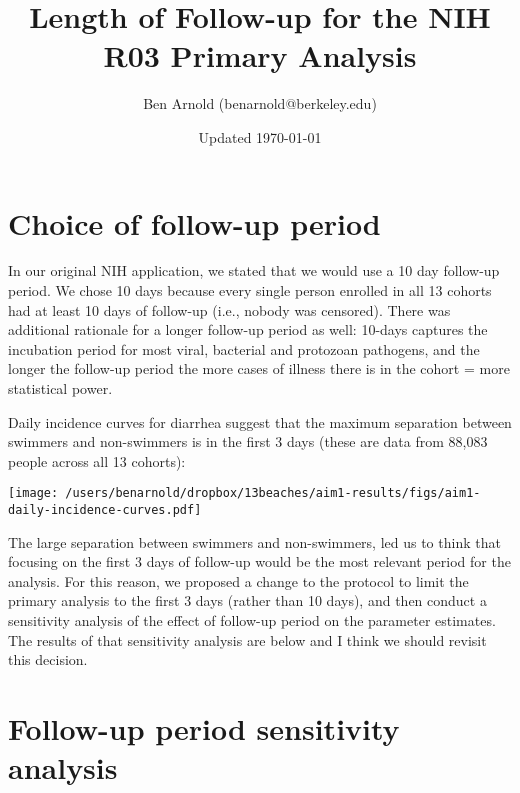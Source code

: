 \documentclass[11pt]{article}
\title{Length of Follow-up for the NIH R03 Primary Analysis}
\author{Ben Arnold (benarnold@berkeley.edu)}
\date{Updated \today}
\begin{document}
\maketitle


\section*{Choice of follow-up period}

In our original NIH application, we stated that we would use a 10 day follow-up period. We chose 10 days because every single person enrolled in all 13 cohorts had at least 10 days of follow-up (i.e., nobody was censored).  There was additional rationale for a longer follow-up period as well: 10-days captures the incubation period for most viral, bacterial and protozoan pathogens, and the longer the follow-up period the more cases of illness there is in the cohort = more statistical power.

Daily incidence curves for diarrhea suggest that the maximum separation between swimmers and non-swimmers is in the first 3 days (these are data from 88,083 people across all 13 cohorts):

\begin{center}
\texttt{[image: /users/benarnold/dropbox/13beaches/aim1-results/figs/aim1-daily-incidence-curves.pdf]}
\end{center}

The large separation between swimmers and non-swimmers, led us to think that focusing on the first 3 days of follow-up would be the most relevant period for the analysis.  For this reason, we proposed a change to the protocol to limit the primary analysis to the first 3 days (rather than 10 days), and then conduct a sensitivity analysis of the effect of follow-up period on the parameter estimates.  The results of that sensitivity analysis are below and I think we should revisit this decision.

\section*{Follow-up period sensitivity analysis}
\end{document}
